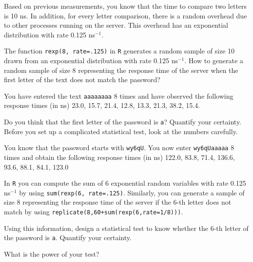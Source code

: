 \documentclass[12pt]{article}
\begin{document}
  Based on previous measurements, you know that the
  time to compare two letters is 10 ns. In addition, for
  every letter comparison, there is a random overhead due
  to other processes running on the server. This overhead
  has an exponential distribution with rate 0.125 ns$^{-1}$.

\begin{Exercise}
  The function \texttt{rexp(8, rate=.125)} in \texttt{R}
  generates a random sample of size 10 drawn from an
  exponential distribution with rate 0.125 ns$^{-1}$.
  How to generate a random sample of size 8 representing
  the response time of the server when the first letter of
  the text does not match the password?
\end{Exercise}

  You have entered the text \texttt{aaaaaaaa} 8 times
  and have observed the following response times (in ns)
  23.0, 15.7, 21.4, 12.8, 13.3, 21.3, 38.2, 15.4.

\begin{Exercise}
  Do you think that the first letter of the password is
  \texttt{a}? Quantify your certainty. Before you set up 
  a complicated statistical test, look at the numbers
  carefully.
\end{Exercise}

  You know that the password starts with \texttt{wy6qU}.
  You now enter \texttt{wy6qUaaaaa} 8 times and obtain
  the following response times (in ns)
  122.0, 83.8, 71.4, 136.6, 93.6, 88.1, 84.1, 123.0

  In \texttt{R} you can compute the sum of 6 exponential
  random variables with rate 0.125 ns$^{-1}$ by using
  \texttt{sum(rexp(6, rate=.125)}. Similarly, you can
  generate a sample of size 8 representing the response
  time of the server if the 6-th letter does not match
  by using \texttt{replicate(8,60+sum(rexp(6,rate=1/8)))}.

\begin{Exercise}
  Using this information, design a statistical test to
  know whether the 6-th letter of the password is \texttt{a}.
  Quantify your certainty.
\end{Exercise}

\begin{Exercise}
  What is the power of your test?
\end{Exercise}
\end{document}
